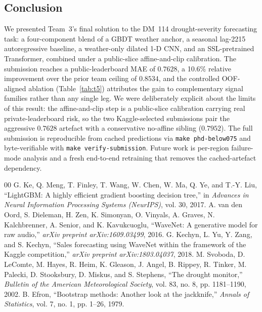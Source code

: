 \documentclass[conference,10pt,a4paper]{IEEEtran}
\begin{document}
\subsection{Conclusion}
We presented Team~3's final solution to the DM~114 drought-severity forecasting task: a four-component blend of a GBDT weather anchor, a seasonal lag-2215 autoregressive baseline, a weather-only dilated 1-D CNN, and an SSL-pretrained Transformer, combined under a public-slice affine-and-clip calibration. The submission reaches a public-leaderboard MAE of $0.7628$, a 10.6\% relative improvement over the prior team ceiling of $0.8534$, and the controlled OOF-aligned ablation (Table~\ref{tab:t5}) attributes the gain to complementary signal families rather than any single leg. We were deliberately explicit about the limits of this result: the affine-and-clip step is a public-slice calibration carrying real private-leaderboard risk, so the two Kaggle-selected submissions pair the aggressive $0.7628$ artefact with a conservative no-affine sibling ($0.7952$). The full submission is reproducible from cached predictions via \texttt{make phd-below075} and byte-verifiable with \texttt{make verify-submission}. Future work is per-region failure-mode analysis and a fresh end-to-end retraining that removes the cached-artefact dependency.


\begin{thebibliography}{00}
 G. Ke, Q. Meng, T. Finley, T. Wang, W. Chen, W. Ma, Q. Ye, and T.-Y. Liu, ``LightGBM: A highly efficient gradient boosting decision tree,'' in \emph{Advances in Neural Information Processing Systems (NeurIPS)}, vol. 30, 2017.
 A. van den Oord, S. Dieleman, H. Zen, K. Simonyan, O. Vinyals, A. Graves, N. Kalchbrenner, A. Senior, and K. Kavukcuoglu, ``WaveNet: A generative model for raw audio,'' \emph{arXiv preprint arXiv:1609.03499}, 2016.
 G. Kechyn, L. Yu, Y. Zang, and S. Kechyn, ``Sales forecasting using WaveNet within the framework of the Kaggle competition,'' \emph{arXiv preprint arXiv:1803.04037}, 2018.
 M. Svoboda, D. LeComte, M. Hayes, R. Heim, K. Gleason, J. Angel, B. Rippey, R. Tinker, M. Palecki, D. Stooksbury, D. Miskus, and S. Stephens, ``The drought monitor,'' \emph{Bulletin of the American Meteorological Society}, vol. 83, no. 8, pp. 1181--1190, 2002.
 B. Efron, ``Bootstrap methods: Another look at the jackknife,'' \emph{Annals of Statistics}, vol. 7, no. 1, pp. 1--26, 1979.
\end{thebibliography}
\end{document}
